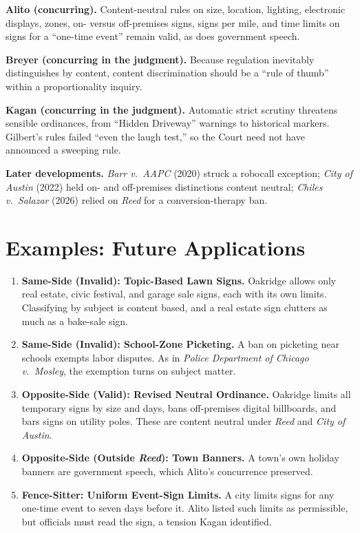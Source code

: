 \documentclass[12pt]{article}
\begin{document}
\textbf{Alito (concurring).} Content-neutral rules on size, location, lighting, electronic displays, zones, on- versus off-premises signs, signs per mile, and time limits on signs for a ``one-time event'' remain valid, as does government speech.

\textbf{Breyer (concurring in the judgment).} Because regulation inevitably distinguishes by content, content discrimination should be a ``rule of thumb'' within a proportionality inquiry.

\textbf{Kagan (concurring in the judgment).} Automatic strict scrutiny threatens sensible ordinances, from ``Hidden Driveway'' warnings to historical markers. Gilbert's rules failed ``even the laugh test,'' so the Court need not have announced a sweeping rule.

\textbf{Later developments.} \textit{Barr v.\ AAPC} (2020) struck a robocall exception; \textit{City of Austin} (2022) held on- and off-premises distinctions content neutral; \textit{Chiles v.\ Salazar} (2026) relied on \textit{Reed} for a conversion-therapy ban.

\section{Examples: Future Applications}

\begin{enumerate}
\item \textbf{Same-Side (Invalid): Topic-Based Lawn Signs.} Oakridge allows only real estate, civic festival, and garage sale signs, each with its own limits. Classifying by subject is content based, and a real estate sign clutters as much as a bake-sale sign.
\item \textbf{Same-Side (Invalid): School-Zone Picketing.} A ban on picketing near schools exempts labor disputes. As in \textit{Police Department of Chicago v.\ Mosley}, the exemption turns on subject matter.
\item \textbf{Opposite-Side (Valid): Revised Neutral Ordinance.} Oakridge limits all temporary signs by size and days, bans off-premises digital billboards, and bars signs on utility poles. These are content neutral under \textit{Reed} and \textit{City of Austin}.
\item \textbf{Opposite-Side (Outside \textit{Reed}): Town Banners.} A town's own holiday banners are government speech, which Alito's concurrence preserved.
\item \textbf{Fence-Sitter: Uniform Event-Sign Limits.} A city limits signs for any one-time event to seven days before it. Alito listed such limits as permissible, but officials must read the sign, a tension Kagan identified.
\end{enumerate}
\end{document}
